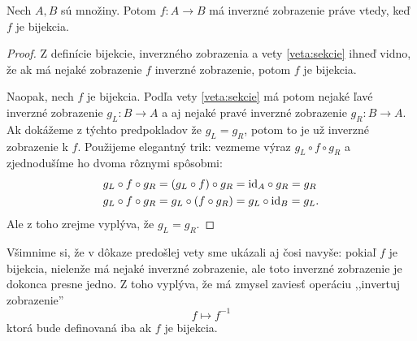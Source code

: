 \begin{veta}\label{veta:bijekciaInverzne}
Nech $A,B$ sú množiny. Potom $f\colon A\to B$ má inverzné zobrazenie práve vtedy, keď $f$ je bijekcia.
\end{veta}
\begin{proof}
Z definície bijekcie, inverzného zobrazenia a vety \ref{veta:sekcie} ihneď vidno, že ak má nejaké zobrazenie 
$f$ inverzné zobrazenie, potom $f$ je bijekcia.

Naopak, nech $f$ je bijekcia. Podľa vety \ref{veta:sekcie} má potom nejaké ľavé inverzné zobrazenie 
$g_L\colon B\to A$ a aj nejaké pravé inverzné zobrazenie $g_R\colon B\to A$. 
Ak dokážeme z týchto predpokladov že $g_L=g_R$, potom to je už inverzné zobrazenie k $f$.
Použijeme elegantný trik: vezmeme výraz $g_L\circ f\circ g_R$ a zjednodušíme ho dvoma
rôznymi spôsobmi:
\begin{align*}
g_L\circ f\circ g_R&=(g_L\circ f)\circ g_R=\mathrm{id}_A\circ g_R=g_R\\
g_L\circ f\circ g_R&=g_L\circ (f\circ g_R)=g_L\circ\mathrm{id}_B=g_L.
\end{align*}
Ale z toho zrejme vyplýva, že $g_L=g_R$.
\end{proof}
Všimnime si, že v dôkaze predošlej vety sme ukázali aj čosi navyše: pokiaľ $f$ je bijekcia, nielenže má
nejaké inverzné zobrazenie, ale toto inverzné zobrazenie je dokonca presne jedno. Z toho vyplýva, že má zmysel
zaviesť operáciu ,,invertuj zobrazenie''
\[
f\mapsto f^{-1}
\]
ktorá bude definovaná iba ak $f$ je bijekcia. 

